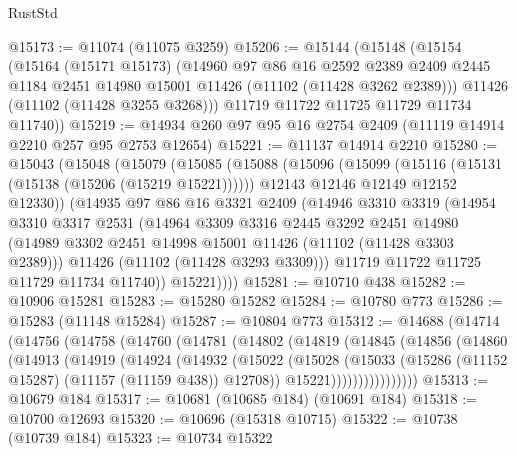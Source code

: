 \begin{lexlean}{RustStd}
\begin{coremodule}
@15173 := @11074 (@11075 @3259)
@15206 := @15144
    (@15148
      (@15154
        (@15164
          (@15171 @15173)
          (@14960
            @97
            @86
            @16
            @2592
            @2389
            @2409
            @2445
            @1184
            @2451
            @14980
            @15001
            @11426
            (@11102 (@11428 @3262 @2389)))
          @11426
          (@11102 (@11428 @3255 @3268)))
        @11719
        @11722
        @11725
        @11729
        @11734
        @11740))
@15219 := @14934 @260 @97 @95 @16 @2754 @2409 (@11119 @14914 @2210 @257 @95 @2753 @12654)
@15221 := @11137 @14914 @2210
@15280 := @15043
    (@15048
      (@15079
        (@15085
          (@15088
            (@15096
              (@15099 (@15116 (@15131 (@15138 (@15206 (@15219 @15221))))))
              @12143
              @12146
              @12149
              @12152
              @12330))
          (@14935
            @97
            @86
            @16
            @3321
            @2409
            (@14946
              @3310
              @3319
              (@14954
                @3310
                @3317
                @2531
                (@14964
                  @3309
                  @3316
                  @2445
                  @3292
                  @2451
                  @14980
                  (@14989 @3302 @2451 @14998 @15001 @11426 (@11102 (@11428 @3303 @2389)))
                  @11426
                  (@11102 (@11428 @3293 @3309)))
                @11719
                @11722
                @11725
                @11729
                @11734
                @11740))
            @15221))))
@15281 := @10710 @438
@15282 := @10906 @15281
@15283 := @15280 @15282
@15284 := @10780 @773
@15286 := @15283 (@11148 @15284)
@15287 := @10804 @773
@15312 := @14688
    (@14714
      (@14756
        (@14758
          (@14760
            (@14781
              (@14802
                (@14819
                  (@14845
                    (@14856
                      (@14860
                        (@14913
                          (@14919
                            (@14924
                              (@14932
                                (@15022
                                  (@15028
                                    (@15033 (@15286 (@11152 @15287) (@11157 (@11159 @438)) @12708))
                                    @15221))))))))))))))))
@15313 := @10679 @184
@15317 := @10681 (@10685 @184) (@10691 @184)
@15318 := @10700 @12693
@15320 := @10696 (@15318 @10715)
@15322 := @10738 (@10739 @184)
@15323 := @10734 @15322

\end{coremodule}
\end{lexlean}
